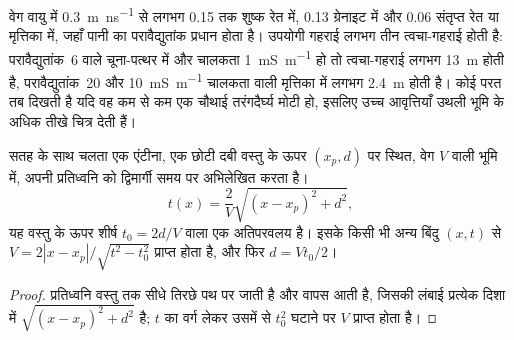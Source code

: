 वेग वायु में \qty{0.3}{m.ns^{-1}} से लगभग \num{0.15} तक
शुष्क रेत में, \num{0.13} ग्रेनाइट में और \num{0.06} संतृप्त रेत या
मृत्तिका में, जहाँ पानी का परावैद्युतांक प्रधान होता है। उपयोगी गहराई
लगभग तीन त्वचा-गहराई होती है: परावैद्युतांक~6 वाले चूना-पत्थर में और
चालकता \qty{1}{mS.m^{-1}} हो तो त्वचा-गहराई लगभग \qty{13}{m} होती है,
परावैद्युतांक~20 और \qty{10}{mS.m^{-1}} चालकता वाली मृत्तिका में लगभग
\qty{2.4}{m} होती है। कोई परत तब दिखती है यदि वह कम से कम एक चौथाई
तरंगदैर्घ्य मोटी हो, इसलिए उच्च आवृत्तियाँ
उथली भूमि के अधिक तीखे चित्र देती हैं।

\begin{proposition}[विवर्तन अतिपरवलय]\label{prop:b3:field-lab-methods-3:hyperbola}
सतह के साथ चलता एक एंटीना, एक छोटी दबी वस्तु के ऊपर
$(x_p, d)$ पर स्थित, वेग $V$ वाली भूमि में, अपनी प्रतिध्वनि को द्विमार्गी
समय पर अभिलेखित करता है।
\[
t(x) = \frac{2}{V}\sqrt{(x - x_p)^2 + d^2} ,
\]
यह वस्तु के ऊपर शीर्ष $t_0 = 2d/V$ वाला एक अतिपरवलय है। इसके किसी भी अन्य बिंदु
$(x, t)$ से $V = 2|x - x_p|/\sqrt{t^2 - t_0^2}$ प्राप्त होता है, और फिर $d =
Vt_0/2$।
\end{proposition}

\begin{proof}
प्रतिध्वनि वस्तु तक सीधे तिरछे पथ पर जाती है और वापस आती है,
जिसकी लंबाई प्रत्येक दिशा में $\sqrt{(x - x_p)^2 + d^2}$ है; $t$ का वर्ग लेकर
उसमें से $t_0^2$ घटाने पर $V$ प्राप्त होता है।
\end{proof}

